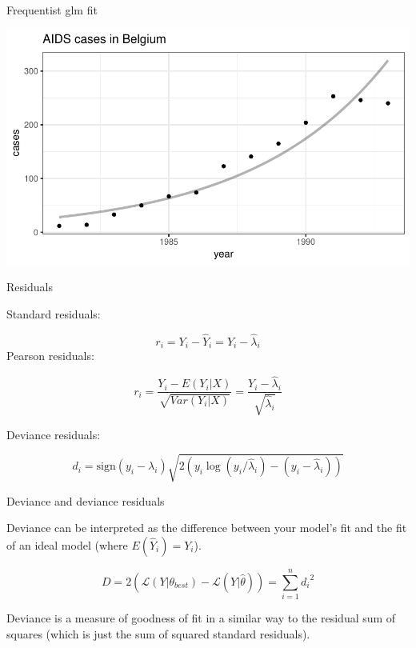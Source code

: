 \documentclass[11pt,ignorenonframetext,]{beamer}
\newenvironment{Shaded}{}{}
\newcommand{\KeywordTok}[1]{\textcolor[rgb]{0.00,0.44,0.13}{\textbf{{#1}}}}
\newcommand{\DataTypeTok}[1]{\textcolor[rgb]{0.56,0.13,0.00}{{#1}}}
\newcommand{\DecValTok}[1]{\textcolor[rgb]{0.25,0.63,0.44}{{#1}}}
\newcommand{\FloatTok}[1]{\textcolor[rgb]{0.25,0.63,0.44}{{#1}}}
\newcommand{\StringTok}[1]{\textcolor[rgb]{0.25,0.44,0.63}{{#1}}}
\newcommand{\NormalTok}[1]{{#1}}
\let\oldShaded\Shaded
\let\endoldShaded\endShaded
\renewenvironment{Shaded}{\footnotesize\begin{spacing}{0.9}\oldShaded}{\endoldShaded\end{spacing}}
\begin{document}
\begin{frame}[fragile]{Frequentist glm fit}

\begin{Shaded}
\end{Shaded}

\includegraphics{Lec3_files/figure-beamer/unnamed-chunk-9-1.pdf}

\end{frame}

\begin{frame}{Residuals}

Standard residuals:

\[ r_i = Y_i - \hat{Y}_i = Y_i - \hat\lambda_i\] Pearson residuals:

\[ r_i = \frac{Y_i - E(Y_i|X)}{\sqrt{Var(Y_i|X)}} = \frac{Y_i - \hat\lambda_i}{\sqrt{\hat\lambda_i}}\]

Deviance residuals:

\[ d_i = \text{sign}(y_i - \lambda_i) \sqrt{2(y_i \log (y_i/\hat\lambda_i) - (y_i-\hat\lambda_i))}\]

\end{frame}

\begin{frame}{Deviance and deviance residuals}

Deviance can be interpreted as the difference between your model's fit
and the fit of an ideal model (where \(E(\hat{Y}_i) = Y_i\)).

\[ D = 2(\mathcal{L}(Y|\theta_{best}) - \mathcal{L}(Y|\hat\theta)) = \sum_{i=1}^n {d_i}^2 \]

Deviance is a measure of goodness of fit in a similar way to the
residual sum of squares (which is just the sum of squared standard
residuals).

\end{frame}
\end{document}

